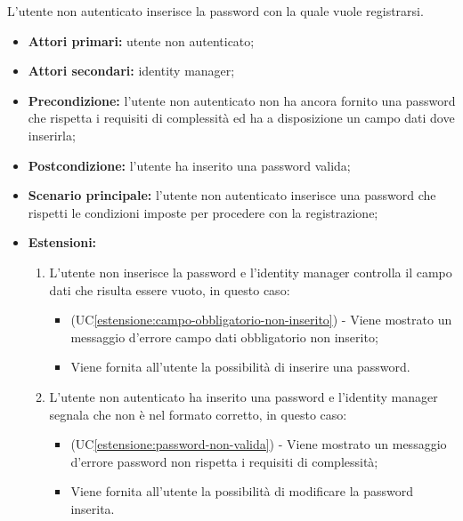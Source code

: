 L'utente non autenticato inserisce la password con la quale vuole registrarsi.
\begin{itemize}
	\item \textbf{Attori primari:} utente non autenticato;
	\item \textbf{Attori secondari:} identity manager;
	\item \textbf{Precondizione:} l'utente non autenticato non ha ancora fornito una password che rispetta i requisiti di complessità ed ha a disposizione un campo dati dove inserirla;
	\item \textbf{Postcondizione:} l'utente ha inserito una password valida;
	\item \textbf{Scenario principale:} l'utente non autenticato inserisce una password che rispetti le condizioni imposte per procedere con la registrazione;
	\item \textbf{Estensioni:}
	\begin{enumerate}[label=\lett]
		\item L'utente non inserisce la password e l'identity manager controlla il campo dati che risulta essere vuoto, in questo caso:
		\begin{itemize}
			\item (UC\ref{estensione:campo-obbligatorio-non-inserito}) - Viene mostrato un messaggio d'errore campo dati obbligatorio non inserito;
			\item Viene fornita all'utente la possibilità di inserire una password.
		\end{itemize}
		\item L'utente non autenticato ha inserito una password e l'identity manager segnala che non è nel formato corretto, in questo caso:
		\begin{itemize}
			\item (UC\ref{estensione:password-non-valida}) - Viene mostrato un messaggio d'errore password non rispetta i requisiti di complessità;
			\item Viene fornita all'utente la possibilità di modificare la password inserita.
		\end{itemize}
	\end{enumerate} 
\end{itemize}

\label{registrazione.modulo.conferma-password}

